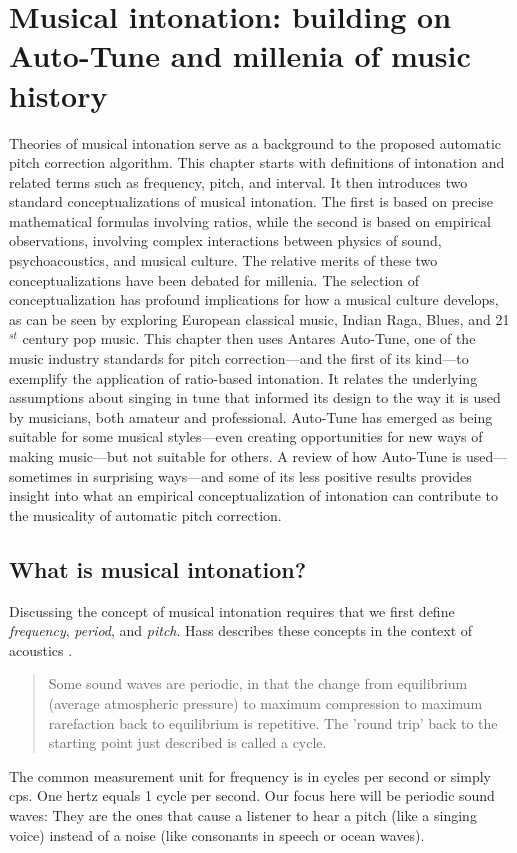 \chapter{Musical intonation: building on Auto-Tune and millenia of music history}
\label{chap:intonation}
Theories of musical intonation serve as a background to the proposed automatic pitch correction algorithm. This chapter starts with definitions of intonation and related terms such as frequency, pitch, and interval. It then introduces two standard conceptualizations of musical intonation. The first is based on precise mathematical formulas involving ratios, while the second is based on empirical observations, involving complex interactions between physics of sound, psychoacoustics, and musical culture. The relative merits of these two conceptualizations have been debated for millenia. The selection of conceptualization has profound implications for how a musical culture develops, as can be seen by exploring European classical music, Indian Raga, Blues, and 21$^{st}$ century pop music. This chapter then uses Antares Auto-Tune, one of the music industry standards for pitch correction---and the first of its kind---to exemplify the application of ratio-based intonation. It relates the underlying assumptions about singing in tune that informed its design to the way it is used by musicians, both amateur and professional. Auto-Tune has emerged as being suitable for some musical styles---even creating opportunities for new ways of making music---but not suitable for others. A review of how Auto-Tune is used---sometimes in surprising ways---and some of its less positive results provides insight into what an empirical conceptualization of intonation can contribute to the musicality of automatic pitch correction.

\section{What is musical intonation?} 
Discussing the concept of musical intonation requires that we first define \textit{frequency}, \textit{period}, and \textit{pitch}. Hass describes these concepts in the context of acoustics \cite{hass2019introduction}. \begin{quotation}Some sound waves are periodic, in that the change from equilibrium (average atmospheric pressure) to maximum compression to maximum rarefaction back to equilibrium is repetitive. The 'round trip' back to the starting point just described is called a cycle. \cite[][Ch.~1, Sec.~4--5]{hass2019introduction} \end{quotation} The common measurement unit for frequency is in cycles per second or simply cps. One hertz equals 1 cycle per second. Our focus here will be periodic sound waves: They are the ones that cause a listener to hear a pitch (like a singing voice) instead of a noise (like consonants in speech or ocean waves). %

